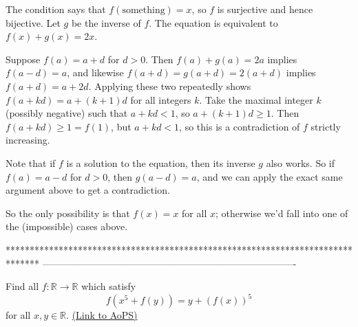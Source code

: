 \begin{solution}
	The condition says that $f(\text{something}) = x$, so $f$ is surjective and hence bijective. Let $g$ be the inverse of $f$. The equation is equivalent to $f(x) + g(x) = 2x$.

Suppose $f(a) = a + d$ for $d > 0$. Then $f(a) + g(a) = 2a$ implies $f(a-d) = a$, and likewise $f(a+d) = g(a+d) = 2(a+d)$ implies $f(a+d) = a+2d$. Applying these two repeatedly shows $f(a+kd) = a + (k+1)d$ for all integers $k$. Take the maximal integer $k$ (possibly negative) such that $a + kd < 1$, so $a + (k+1)d \geq 1$. Then $f(a+kd) \geq 1 = f(1)$, but $a+kd < 1$, so this is a contradiction of $f$ strictly increasing.

Note that if $f$ is a solution to the equation, then its inverse $g$ also works. So if $f(a) = a-d$ for $d > 0$, then $g(a-d) = a$, and we can apply the exact same argument above to get a contradiction.

So the only possibility is that $f(x) = x$ for all $x$; otherwise we'd fall into one of the (impossible) cases above.
\end{solution}
*******************************************************************************
-------------------------------------------------------------------------------

\begin{problem}
	Find all $f:\mathbb{R}\rightarrow \mathbb{R}$ which satisfy
\[f(x^5+f(y))=y+(f(x))^5\]
for all $x, y \in \mathbb R$.
	\flushright \href{https://artofproblemsolving.com/community/c6h399997}{(Link to AoPS)}
\end{problem}



